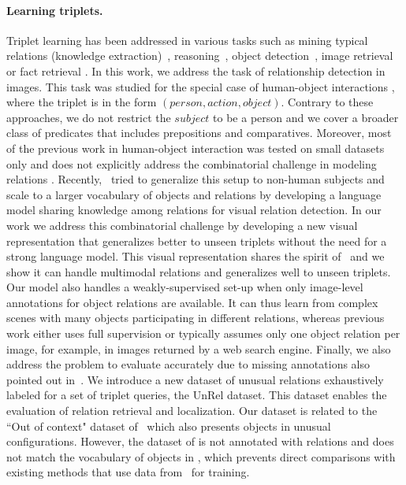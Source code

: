 \documentclass[10pt,twocolumn,letterpaper]{article}
\begin{document}
\paragraph{Learning triplets.} 
Triplet learning has been addressed in various tasks such as mining typical relations (knowledge extraction)~\cite{chen2013neil,sadeghi2015viske,yatskar2016stating,Zhu2014}, reasoning~\cite{jenatton2012,Movshovitz-attias,Socher2013b}, object detection~\cite{Gupta08,Sadeghi2011}, image retrieval~\cite{Johnson15a} or fact retrieval \cite{elhoseiny2015sherlock}. In this work, we address the task of relationship detection in images. This task was studied for the special case of human-object interactions \cite{Delaitre11,Desai2010,Gupta2009,Prest12,ramanathan15,Yao2010,Yao2010a,Yao11}, where the triplet is in the form $(person, action, object)$. Contrary to these approaches, we do not restrict the $subject$ to be a person and we cover a broader class of predicates that includes prepositions and comparatives. Moreover, most of the previous work in human-object interaction was tested on small datasets only and does not explicitly address the combinatorial challenge in modeling relations \cite{Sadeghi2011}. Recently,~\cite{Lu16} tried to generalize this setup to non-human subjects and scale to a larger vocabulary of objects and relations by developing a language model sharing knowledge among relations for visual relation detection. In our work we address this combinatorial challenge by developing a new visual representation that generalizes better to unseen triplets without the need for a strong language model. This visual representation shares the spirit of~\cite{galleguillos2008object,Johnson15a,li2012automatic} and we show it can handle multimodal relations and generalizes well to unseen triplets. Our model also handles a weakly-supervised set-up when only image-level annotations for object relations are available. It can thus learn from complex scenes with many objects participating in different relations, whereas previous work either uses full supervision or typically assumes only one object relation per image, for example, in images returned by a web search engine. 
Finally, we also address the problem to evaluate accurately due to missing annotations also pointed out in~\cite{elhoseiny2015sherlock,Lu16}. We introduce a new dataset of unusual relations exhaustively labeled for a set of triplet queries, the UnRel dataset. This dataset enables the evaluation of relation retrieval and localization. 
Our dataset is related to the ``Out of context" dataset of~\cite{Choi2012} which also presents objects in unusual configurations. However, the dataset of \cite{Choi2012} is not annotated with relations and does not match the vocabulary of objects in \cite{Lu16}, which prevents direct comparisons with existing methods that use data from~\cite{Lu16} for training.
\end{document}
